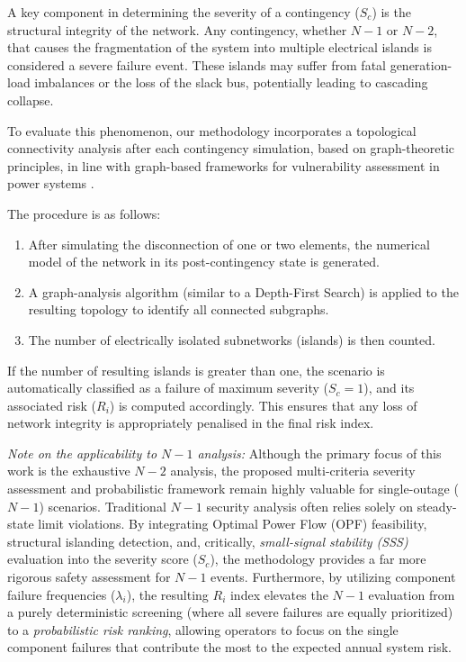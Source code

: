 \documentclass[journal]{IEEEtran}
\begin{document}
A key component in determining the severity of a contingency ($S_c$) is the structural integrity of the network. Any contingency, whether $N-1$ or $N-2$, that causes the fragmentation of the system into multiple electrical islands is considered a severe failure event. These islands may suffer from fatal generation-load imbalances or the loss of the slack bus, potentially leading to cascading collapse.

To evaluate this phenomenon, our methodology incorporates a topological connectivity analysis after each contingency simulation, based on graph-theoretic principles, in line with graph-based frameworks for vulnerability assessment in power systems \cite{sperstad_vulnerability_graph, veragrid}.


The procedure is as follows:
\begin{enumerate}
    \item After simulating the disconnection of one or two elements, the numerical model of the network in its post-contingency state is generated.
    \item A graph-analysis algorithm (similar to a Depth-First Search) \cite{tarjan} is applied to the resulting topology to identify all connected subgraphs.
    \item The number of electrically isolated subnetworks (islands) is then counted.
\end{enumerate}

If the number of resulting islands is greater than one, the scenario is automatically classified as a failure of maximum severity ($S_c = 1$), and its associated risk ($R_i$) is computed accordingly. This ensures that any loss of network integrity is appropriately penalised in the final risk index.


\par
\textit{Note on the applicability to $N-1$ analysis:} Although the primary focus of this work is the exhaustive $N-2$ analysis, the proposed multi-criteria severity assessment and probabilistic framework remain highly valuable for single-outage ($N-1$) scenarios. Traditional $N-1$ security analysis often relies solely on steady-state limit violations. By integrating Optimal Power Flow (OPF) feasibility, structural islanding detection, and, critically, \textit{small-signal stability (SSS)} evaluation into the severity score ($S_c$), the methodology provides a far more rigorous safety assessment for $N-1$ events. Furthermore, by utilizing component failure frequencies ($\lambda_i$), the resulting $R_i$ index elevates the $N-1$ evaluation from a purely deterministic screening (where all severe failures are equally prioritized) to a \textit{probabilistic risk ranking}, allowing operators to focus on the single component failures that contribute the most to the expected annual system risk.
\end{document}
